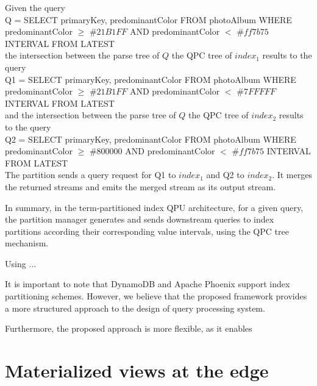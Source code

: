 Given the query \\
{\obeylines\obeyspaces
Q = SELECT primaryKey, predominantColor
    FROM photoAlbum
    WHERE predominantColor $\geq$ $\#21B1FF$ AND predominantColor $<$ $\#ff7b75$
    INTERVAL FROM LATEST
} ~\\
the intersection between the parse tree of $Q$ the QPC tree of $index_1$ results to the query \\
{\obeylines\obeyspaces
Q1 = SELECT primaryKey, predominantColor
    FROM photoAlbum
    WHERE predominantColor $\geq$ $\#21B1FF$ AND predominantColor $<$ $\#7FFFFF$
    INTERVAL FROM LATEST
} ~\\
and the intersection between the parse tree of $Q$ the QPC tree of $index_2$ results to the query \\
{\obeylines\obeyspaces
Q2 = SELECT primaryKey, predominantColor
    FROM photoAlbum
    WHERE predominantColor $\geq$ $\#800000$ AND predominantColor $<$ $\#ff7b75$
    INTERVAL FROM LATEST
} ~\\
The partition sends a query request for Q1 to $index_1$ and Q2 to $index_2$.
It merges the returned streams and emits the merged stream as its output stream.

In summary, in the term-partitioned index QPU architecture,
for a given query, the partition manager generates and sends downstream queries to index partitions according their corresponding
value intervals, using the QPC tree mechanism.

\medskip
\noindent

Using ... 

It is important to note that DynamoDB \cite{dynamodb:secondaryindexes} and Apache Phoenix \cite{phoenix:secondaryidnexing}
support index partitioning schemes.
However, we believe that the proposed framework provides a more structured approach to the design of query processing system.

Furthermore, the proposed approach is more flexible, as it enables


\section{Materialized views at the edge}

